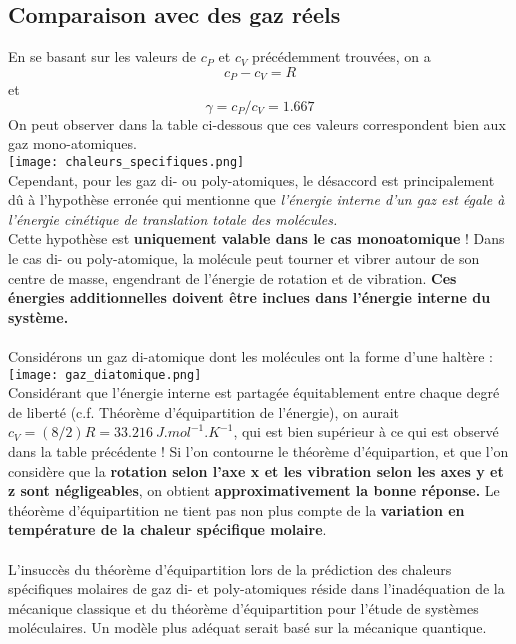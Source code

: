 \documentclass{article}
\begin{document}
    \subsection{Comparaison avec des gaz réels}
        En se basant sur les valeurs de $c_P$ et $c_V$ précédemment trouvées, on a 
        $$
        c_P - c_V = R
        $$
        et
        $$
        \gamma = c_P / c_V = 1.667
        $$
        On peut observer dans la table ci-dessous que ces valeurs correspondent bien aux gaz mono-atomiques.\\
        \texttt{[image: chaleurs\_specifiques.png]}\\
        Cependant, pour les gaz di- ou poly-atomiques, le désaccord est principalement dû à l'hypothèse erronée qui mentionne que \textit{l’énergie interne d’un gaz est égale à l’énergie cinétique de translation totale des molécules.}\\
        Cette hypothèse est \textbf{uniquement valable dans le cas monoatomique} ! 
        Dans le cas di- ou poly-atomique, la molécule peut tourner et vibrer autour de son centre de masse, engendrant de l’énergie de rotation et de vibration. 
        \textbf{Ces énergies additionnelles doivent être inclues dans l’énergie interne du système.}\\\\
        Considérons un gaz di-atomique dont les molécules ont la forme d'une haltère :\\
        \texttt{[image: gaz\_diatomique.png]}\\
        Considérant que l'énergie interne est partagée équitablement entre chaque degré de liberté (c.f. Théorème d'équipartition de l'énergie), on aurait $c_V = (8/2)R = 33.216 \: J.mol^{-1}.K^{-1}$, qui est bien supérieur à ce qui est observé dans la table précédente !
        Si l'on contourne le théorème d'équipartion, et que l'on considère que la \textbf{rotation selon l'axe x et les vibration selon les axes y et z sont négligeables}, on obtient \textbf{approximativement la bonne réponse.}
        Le théorème d'équipartition ne tient pas non plus compte de la \textbf{variation en température de la chaleur spécifique molaire}. \\\\
        L’insuccès du théorème d’équipartition lors de la prédiction des chaleurs spécifiques molaires de gaz di- et poly-atomiques réside dans l’inadéquation de la mécanique classique et du théorème d'équipartition pour l’étude de systèmes moléculaires. 
        Un modèle plus adéquat serait basé sur la mécanique quantique.
    
\end{document}
